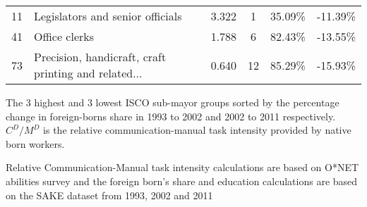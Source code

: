 \begin{sideways}
\begin{threeparttable}
\begin{tabular}{clcccc}
	11 & Legislators and senior officials & 3.322 & 1 & 35.09\% & -11.39\% \\
	41 & Office clerks & 1.788 & 6 & 82.43\% & -13.55\% \\
	73 & Precision, handicraft, craft printing and related... & 0.640 & 12 & 85.29\% & -15.93\% \\

      \bottomrule
    \end{tabular}
    \begin{tablenotes}
      \small
      \item The 3 highest and 3 lowest  ISCO sub-mayor groups sorted by the percentage change in foreign-borns share in 1993 to 2002 and 2002 to 2011 respectively. $C^D/M^D$ is the relative communication-manual task intensity provided by native born workers.
      \item Relative Communication-Manual task intensity calculations are based on O*NET abilities survey and the foreign born's share and education calculations are based on the SAKE dataset from 1993, 2002 and 2011
    \end{tablenotes}
  \end{threeparttable}
  \end{sideways}